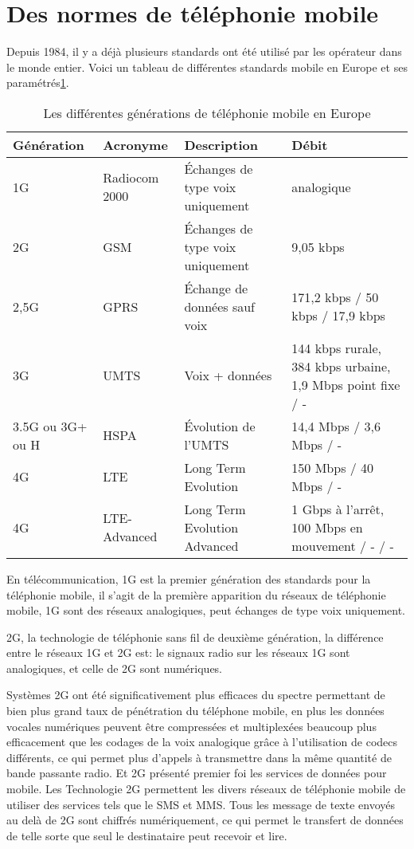 \section{Des normes de téléphonie mobile}
Depuis 1984, il y a déjà plusieurs standards ont été utilisé par les opérateur dans le monde entier. Voici un tableau de différentes standards mobile en Europe et ses paramétrés\ref{tbl:GMIE}. 
\begin{table}[H]
\begin{tabular}{|p{2cm}|p{2cm}|p{2cm}|p{6cm}|}
	\hline
	Génération&Acronyme&Description&Débit\\
	\hline
	1G		&Radiocom 2000	&Échanges de type voix uniquement&analogique\\
	\hline
	\hline
	2G		&GSM			&Échanges de type voix uniquement	&9,05 kbps\\
	\hline
	2,5G	&GPRS			&Échange de données sauf voix		&171,2 kbps / 50 kbps / 17,9 kbps\\
	\hline
	\hline
	3G		&UMTS			&Voix + données						&144 kbps rurale, 384 kbps urbaine, 1,9 Mbps point fixe / -\\
	\hline
	3.5G ou 3G+ ou H&HSPA	&Évolution de l'UMTS				&14,4 Mbps / 3,6 Mbps / -\\
	\hline
	\hline
	4G		&LTE			&Long Term Evolution				&150 Mbps / 40 Mbps / -\\
	\hline
	4G		&LTE-Advanced	&Long Term Evolution Advanced		&1 Gbps à l'arrêt, 100 Mbps en mouvement / - / -\\
	\hline
\end{tabular}
\caption{Les différentes générations de téléphonie mobile en Europe}
 \label{tbl:GMIE}
\end{table}
En télécommunication, \textsf{1G} est la premier génération des standards pour la téléphonie mobile, il s'agit de la première apparition du réseaux de téléphonie mobile, 1G sont des réseaux analogiques, peut échanges de type voix uniquement.

\textsf{2G}, la technologie de téléphonie sans fil de deuxième génération, la différence entre le réseaux 1G et 2G est: le signaux radio sur les réseaux 1G sont analogiques, et celle de 2G sont numériques.

Systèmes 2G ont été significativement plus efficaces du spectre permettant de bien plus grand taux de pénétration du téléphone mobile, en plus les données vocales numériques peuvent être compressées et multiplexées beaucoup plus efficacement que les codages de la voix analogique grâce à l'utilisation de codecs différents, ce qui permet plus d'appels à transmettre dans la même quantité de bande passante radio. Et 2G présenté premier foi les services de données pour mobile. Les Technologie 2G permettent les divers réseaux de téléphonie mobile de utiliser des services tels que le SMS et MMS. Tous les message de texte envoyés au delà de 2G sont chiffrés numériquement, ce qui permet le transfert de données de telle sorte que seul le destinataire peut recevoir et lire.   

